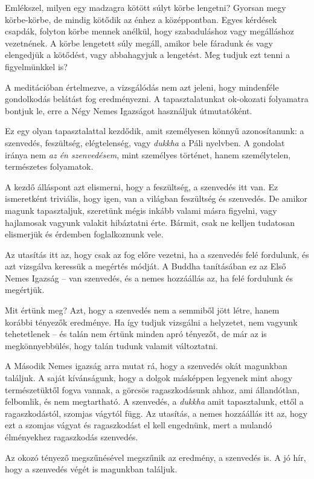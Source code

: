 Emlékszel, milyen egy madzagra kötött súlyt körbe lengetni? Gyorsan megy
körbe-körbe, de mindig kötődik az énhez a középpontban. Egyes kérdések
csapdák, folyton körbe mennek anélkül, hogy szabaduláshoz vagy
megálláshoz vezetnének. A körbe lengetett súly megáll, amikor bele
fáradunk és vagy elengedjük a kötődést, vagy abbahagyjuk a lengetést.
Meg tudjuk ezt tenni a figyelmünkkel is?

A meditációban értelmezve, a vizsgálódás nem azt jeleni, hogy mindenféle
gondolkodás belátást fog eredményezni. A tapasztalatunkat ok-okozati
folyamatra bontjuk le, erre a Négy Nemes Igazságot használjuk
útmutatóként.

Ez egy olyan tapasztalattal kezdődik, amit személyesen könnyű
azonosítanunk: a szenvedés, feszültség, elégtelenség, vagy \emph{dukkha}
a Páli nyelvben. A gondolat iránya nem \emph{az én szenvedésem}, mint
személyes történet, hanem személytelen, természetes folyamatok.

A kezdő álláspont azt elismerni, hogy a feszültség, a szenvedés itt van.
Ez ismeretként triviális, hogy igen, van a világban feszültség és
szenvedés. De amikor magunk tapasztaljuk, szeretünk mégis inkább valami
másra figyelni, vagy hajlamosak vagyunk valakit hibáztatni érte. Bármit,
csak ne kelljen tudatosan elismerjük és érdemben foglalkoznunk vele.

Az utasítás itt az, hogy csak az fog előre vezetni, ha a szenvedés felé
fordulunk, és azt vizsgálva keressük a megértés módját. A Buddha
tanításában ez az Első Nemes Igazság -- van szenvedés, és a nemes
hozzáállás az, ha felé fordulunk és megértjük.

Mit értünk meg? Azt, hogy a szenvedés nem a semmiből jött létre, hanem
korábbi tényezők eredménye. Ha így tudjuk vizsgálni a helyzetet, nem
vagyunk tehetetlenek -- és talán nem értünk minden apró tényezőt, de már
az is megkönnyebbülés, hogy talán tudunk valamit változtatni.

A Második Nemes igazság arra mutat rá, hogy a szenvedés okát magunkban
találjuk. A saját kívánságunk, hogy a dolgok másképpen legyenek mint
ahogy természetüktől fogva vannak, a görcsös ragaszkodásunk ahhoz, ami
állandótlan, felbomlik, és nem megtartható. A szenvedés, a \emph{dukkha}
amit tapasztalunk, ettől a ragaszkodástól, szomjas vágytól függ. Az
utasítás, a nemes hozzáállás itt az, hogy ezt a szomjas vágyat és
ragaszkodást el kell engednünk, mert a mulandó élményekhez ragaszkodás
szenvedés.

Az okozó tényező megszűnésével megszűnik az eredmény, a szenvedés is. A
jó hír, hogy a szenvedés végét is magunkban találjuk.


